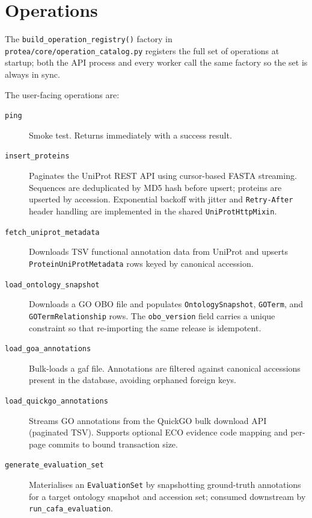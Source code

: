 \section{Operations}
\label{sec:operations}

\begin{sloppypar}
The \texttt{build\_operation\_registry()} factory in
\texttt{protea/core/\allowbreak{}operation\_catalog.py} registers the full set of operations
at startup; both the API process and every worker call the same factory so
the set is always in sync.
\end{sloppypar}
The user-facing operations are:

\begingroup\sloppy
\begin{description}
  \item[\texttt{ping}] Smoke test. Returns immediately with a success result.
  \item[\texttt{insert\_proteins}] Paginates the UniProt REST API using
    cursor-based FASTA streaming. Sequences are deduplicated by MD5 hash before
    upsert; proteins are upserted by accession. Exponential backoff with jitter
    and \texttt{Retry-After} header handling are implemented in the shared
    \texttt{UniProtHttpMixin}.
  \item[\texttt{fetch\_uniprot\_metadata}] Downloads TSV functional annotation
    data from UniProt and upserts \texttt{ProteinUniProtMetadata} rows keyed by
    canonical accession.
  \item[\texttt{load\_ontology\_snapshot}] Downloads a GO OBO file and populates
    \texttt{OntologySnapshot}, \texttt{GOTerm}, and \texttt{GOTermRelationship}
    rows. The \texttt{obo\_version} field carries a unique constraint so that
    re-importing the same release is idempotent.
  \item[\texttt{load\_goa\_annotations}] Bulk-loads a \gls{gaf} file.
    Annotations are filtered against canonical accessions present in the
    database, avoiding orphaned foreign keys.
  \item[\texttt{load\_quickgo\_annotations}] Streams GO annotations from the
    QuickGO bulk download API (paginated TSV). Supports optional ECO evidence
    code mapping and per-page commits to bound transaction size.
  \item[\texttt{generate\_evaluation\_set}] Materialises an \texttt{EvaluationSet}
    by snapshotting ground-truth annotations for a target ontology snapshot and
    accession set; consumed downstream by \texttt{run\_cafa\_evaluation}.

\end{description}
